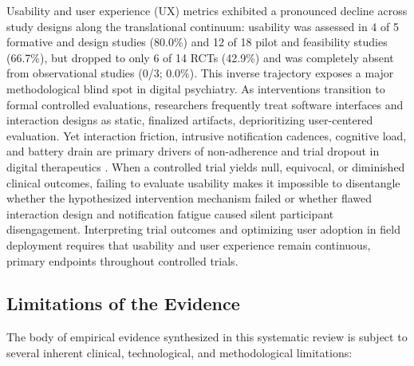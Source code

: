 Usability and user experience (UX) metrics exhibited a pronounced decline across study designs along the translational continuum: usability was assessed in 4 of 5 formative and design studies (80.0\%) and 12 of 18 pilot and feasibility studies (66.7\%), but dropped to only 6 of 14 RCTs (42.9\%) and was completely absent from observational studies (0/3; 0.0\%). This inverse trajectory exposes a major methodological blind spot in digital psychiatry. As interventions transition to formal controlled evaluations, researchers frequently treat software interfaces and interaction designs as static, finalized artifacts, deprioritizing user-centered evaluation. Yet interaction friction, intrusive notification cadences, cognitive load, and battery drain are primary drivers of non-adherence and trial dropout in digital therapeutics \cite{rogan2024health, stone2023evaluation}. When a controlled trial yields null, equivocal, or diminished clinical outcomes, failing to evaluate usability makes it impossible to disentangle whether the hypothesized intervention mechanism failed or whether flawed interaction design and notification fatigue caused silent participant disengagement. Interpreting trial outcomes and optimizing user adoption in field deployment requires that usability and user experience remain continuous, primary endpoints throughout controlled trials.

\subsection{Limitations of the Evidence}

The body of empirical evidence synthesized in this systematic review is subject to several inherent clinical, technological, and methodological limitations:

